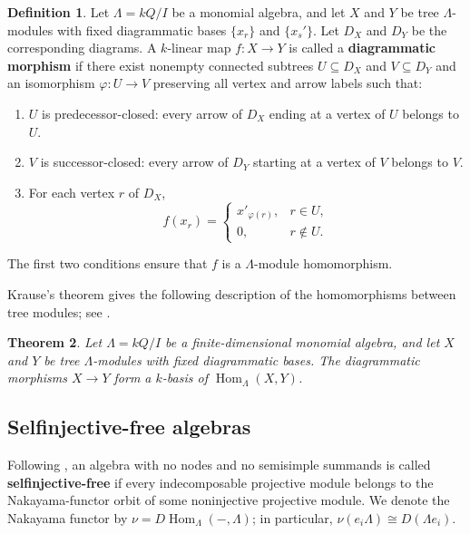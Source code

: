 \documentclass[11pt]{article}
\newcommand{\Hom}{\operatorname{Hom}}
\providecommand{\varLambda}{\Lambda}
\newtheorem{theorem}{Theorem}[section]
\theoremstyle{definition}
\newtheorem{definition}[theorem]{Definition}
\begin{document}
		\begin{definition}\label{definition of diagrammatic morphism}
			Let $\varLambda=kQ/I$ be a monomial algebra, and let $X$ and $Y$ be tree $\varLambda$-modules with fixed diagrammatic bases $\{x_r\}$ and $\{x_s'\}$.
			Let $D_X$ and $D_Y$ be the corresponding diagrams.
			A $k$-linear map $f:X\to Y$ is called a \textbf{diagrammatic morphism} if there exist nonempty connected subtrees $U\subseteq D_X$ and $V\subseteq D_Y$ and an isomorphism $\varphi:U\to V$ preserving all vertex and arrow labels such that:
			\begin{enumerate}
				\item $U$ is predecessor-closed: every arrow of $D_X$ ending at a vertex of $U$ belongs to $U$.
				\item $V$ is successor-closed: every arrow of $D_Y$ starting at a vertex of $V$ belongs to $V$.
				\item For each vertex $r$ of $D_X$,
				\[
					f(x_r)=
					\begin{cases}
						x'_{\varphi(r)},& r\in U,\\
						0,& r\notin U.
					\end{cases}
				\]
			\end{enumerate}
		\end{definition}

		The first two conditions ensure that $f$ is a $\varLambda$-module homomorphism.

		Krause's theorem gives the following description of the homomorphisms between tree modules; see \cite[Theorem]{Kra91}.
		\begin{theorem}\label{theorem of diagrammatic Hom basis}
			Let $\varLambda=kQ/I$ be a finite-dimensional monomial algebra, and let $X$ and $Y$ be tree $\varLambda$-modules with fixed diagrammatic bases.
			The diagrammatic morphisms $X\to Y$ form a $k$-basis of $\Hom_{\varLambda}(X,Y)$.
		\end{theorem}

	\subsection{Selfinjective-free algebras}\label{section of selfinjective-free algebras}

		Following \cite[Section~3]{Mar90}, an algebra with no nodes and no semisimple summands is called \textbf{selfinjective-free} if every indecomposable projective module belongs to the Nakayama-functor orbit of some noninjective projective module.
		We denote the Nakayama functor by $\nu=D\Hom_{\varLambda}(-,\varLambda)$; in particular, $\nu(e_i\varLambda)\cong D(\varLambda e_i)$.
\end{document}
